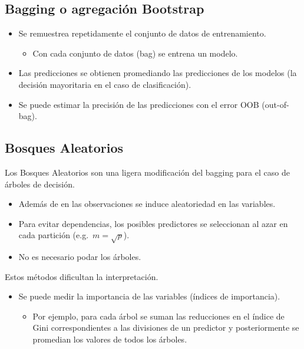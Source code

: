\documentclass[]{book}
\providecommand{\tightlist}{%
  \setlength{\itemsep}{0pt}\setlength{\parskip}{0pt}}
\begin{document}
\hypertarget{bagging-o-agregacion-bootstrap}{%
\subsection{Bagging o agregación Bootstrap}\label{bagging-o-agregacion-bootstrap}}

\begin{itemize}
\item
  Se remuestrea repetidamente el conjunto de datos de
  entrenamiento.

  \begin{itemize}
  \tightlist
  \item
    Con cada conjunto de datos (bag) se entrena un modelo.
  \end{itemize}
\item
  Las predicciones se obtienen promediando las predicciones de los
  modelos (la decisión mayoritaria en el caso de clasificación).
\item
  Se puede estimar la precisión de las predicciones con el error
  OOB (out-of-bag).
\end{itemize}

\hypertarget{bosques-aleatorios}{%
\subsection{Bosques Aleatorios}\label{bosques-aleatorios}}

Los Bosques Aleatorios son una ligera modificación del bagging para
el caso de árboles de decisión.

\begin{itemize}
\item
  Además de en las observaciones se induce aleatoriedad en las
  variables.
\item
  Para evitar dependencias, los posibles predictores se
  seleccionan al azar en cada partición (e.g.~\(m=\sqrt{p}\)).
\item
  No es necesario podar los árboles.
\end{itemize}

Estos métodos dificultan la interpretación.

\begin{itemize}
\item
  Se puede medir la importancia de las variables (índices de
  importancia).

  \begin{itemize}
  \tightlist
  \item
    Por ejemplo, para cada árbol se suman las reducciones en el
    índice de Gini correspondientes a las divisiones de un
    predictor y posteriormente se promedian los valores de todos
    los árboles.
  \end{itemize}
\end{itemize}
\end{document}
